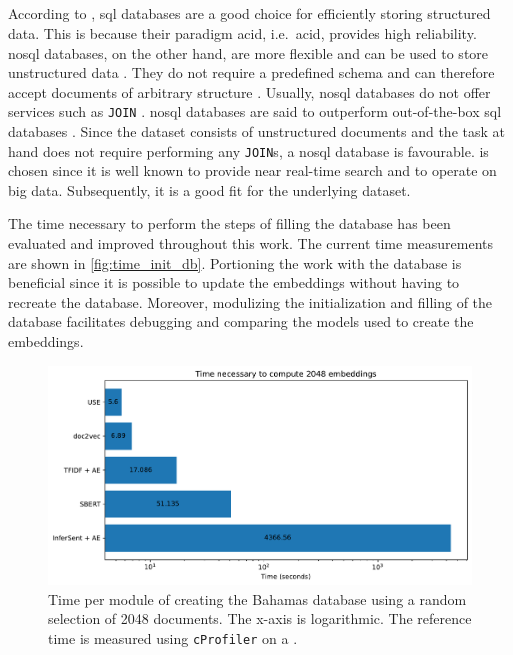 \subsection*{\databaseName{}}\label{subsec:evaluation-db}
According to \citeauthor{flask_book2018}, \ac{sql} databases are a good choice for efficiently storing structured data.
This is because their paradigm \acs{acid}, i.e.\ \acl{acid}, provides high reliability.
\ac{nosql} databases, on the other hand, are more flexible and can be used to store unstructured data \cite{flask_book2018}.
They do not require a predefined schema and can therefore accept documents of arbitrary structure \cite{flask2018}.
Usually, \ac{nosql} databases do not offer services such as \texttt{JOIN} \cite{flask2018}.
\ac{nosql} databases are said to outperform out-of-the-box \ac{sql} databases \cite{flask2018}.
Since the dataset consists of unstructured documents and the task at hand does not require performing any \texttt{JOIN}s, 
a \ac{nosql} database is favourable.
\databaseName{} is chosen since it is well known to provide near real-time search and to operate on big data.
Subsequently, it is a good fit for the underlying dataset.

The time necessary to perform the steps of filling the \databaseName{} database has been evaluated and improved throughout this work.
The current time measurements are shown in \autoref{fig:time_init_db}.
Portioning the work with the database is beneficial since it is possible to update the embeddings without having to recreate the database.
Moreover, modulizing the initialization and filling of the database facilitates debugging and comparing the models used to create the embeddings.

\begin{figure}[!htb] %
    \centering
    \includegraphics[width=1\textwidth]{images/Elasticsearch/Time_necessary_to_compute_2048_embeddings_log.pdf}
    \caption[Times for creating the database]{Time per module of creating the Bahamas database using a random selection of 2048 documents.
    The x-axis is logarithmic.
    The reference time is measured using \texttt{cProfiler} on a \localMaschineStats{}.
    }
    \label{fig:time_init_db}
\end{figure}

